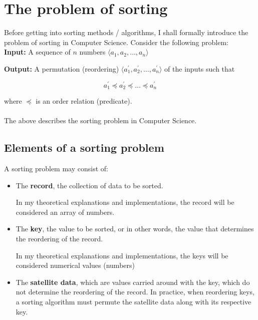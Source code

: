 \documentclass[a4paper]{article}
\begin{document}
    \section{The problem of sorting}

        Before getting into sorting methods / algorithms, I shall formally introduce the problem of sorting in
        Computer Science. Consider the following problem:
        \\

    \textbf{Input:} A sequence of $n$ numbers $\langle a_1 , a_2 , \dots , a_n  \rangle$ 
    
    
    \textbf{Output:} A permutation (reordering) $\langle a_1^{'}, a_2^{'} , \dots , a_n^{'}\rangle$ of the inputs
    such that
     
    $$a_1^{'} \preceq a_2^{'} \preceq \dots \preceq a_n^{'}$$

    where $\preceq$ is an order relation (predicate).
    \\
    \\
    \noindent The above describes the sorting problem in Computer Science.

    \subsection{Elements of  a sorting problem}
        A sorting problem may consist of:
        \begin{itemize}
            \item The \textbf{record}, the collection of data to be sorted.
                    
                    In my theoretical explanations and implementations, the record
                    will be considered an array of numbers.
            \item The \textbf{key}, the value to be sorted, or in other words, the value that
                    determines the reordering of the record.
                    
                    In my theoretical explanations and implementations, the keys will be
                    considered numerical values (numbers)
            \item The \textbf{satellite data}, which are values carried around with the key,
                    which do not determine the reordering of the record. In practice, when
                    reordering keys, a sorting algorithm must permute the satellite data along with
                    its respective key.
        \end{itemize}
\end{document}
